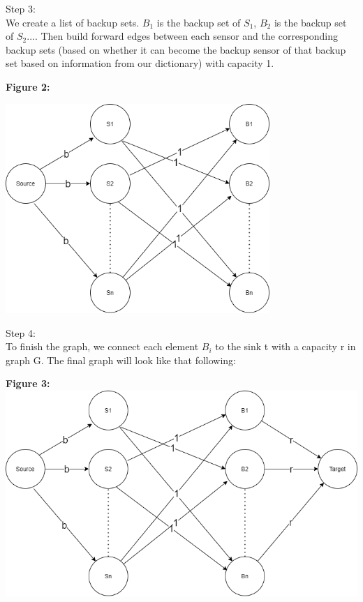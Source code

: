 \documentclass{assignment-373}
\begin{document}
\begin{enumerate}
\begin{center}
    \end{center}
    Step 3:\\
	\phantom{=} \phantom{=} We create a list of backup sets. $B_{1}$ is the backup set of $S_{1}$, $B_{2}$ is the backup set of $S_{2}$.... Then build forward edges between each sensor and the corresponding backup sets (based on whether it can become the backup sensor of that backup set based on information from our dictionary) with capacity 1.
	\begin{center}
	    \textbf{Figure 2:}
	\end{center}
    \begin{center}
    \includegraphics[width=10cm]{./g2.png}
    \end{center}
    
    \newpage
    Step 4:\\
    \phantom{=} \phantom{=} To finish the graph, we connect each element $B_i$ to the sink t with a capacity r in graph G. The final graph will look like that following:\\
    \begin{center}
    \textbf{Figure 3:}
    \includegraphics[width=15cm]{./G.png}
    \end{center}
	

\end{enumerate}
\end{document}
